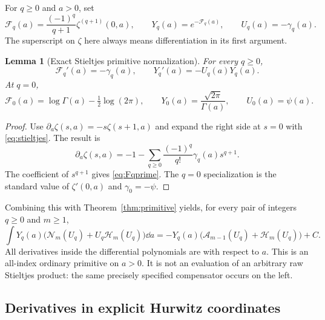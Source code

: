 \documentclass[11pt,letterpaper]{article}
\numberwithin{equation}{section}
\theoremstyle{plain}
\newtheorem{lemma}[theorem]{Lemma}
\theoremstyle{definition}
\theoremstyle{remark}
\newcommand{\Ac}{\mathcal A}\newcommand{\Nc}{\mathcal N}\newcommand{\Hc}{\mathcal H}
\begin{document}
For $q\ge0$ and $a>0$, set
\begin{equation}\label{eq:Fq}
 \mathcal F_q(a)=\frac{(-1)^q}{q+1}\zeta^{(q+1)}(0,a),
 \qquad Y_q(a)=e^{-\mathcal F_q(a)},
 \qquad U_q(a)=-\gamma_q(a).
\end{equation}
The superscript on $\zeta$ here always means differentiation in its first argument.

\begin{lemma}[Exact Stieltjes primitive normalization]\label{lem:Fq}
For every $q\ge0$,
\begin{equation}\label{eq:Fqprime}
 \mathcal F_q'(a)=-\gamma_q(a),\qquad
 Y_q'(a)=-U_q(a)Y_q(a).
\end{equation}
At $q=0$,
\[
 \mathcal F_0(a)=\log\Gamma(a)-\tfrac12\log(2\pi),
 \qquad Y_0(a)=\frac{\sqrt{2\pi}}{\Gamma(a)},\qquad U_0(a)=\psi(a).
\]
\end{lemma}
\begin{proof}
Use $\partial_a\zeta(s,a)=-s\zeta(s+1,a)$ and expand the right side at $s=0$ with \eqref{eq:stieltjes}. The result is
\[
 \partial_a\zeta(s,a)=-1-
       \sum_{q\ge0}\frac{(-1)^q}{q!}\gamma_q(a)s^{q+1}.
\]
The coefficient of $s^{q+1}$ gives \eqref{eq:Fqprime}. The $q=0$ specialization is the standard value of $\zeta'(0,a)$ and $\gamma_0=-\psi$.
\end{proof}

Combining this with Theorem~\ref{thm:primitive} yields, for every pair of integers $q\ge0$ and $m\ge1$,
\begin{equation}\label{eq:stieltjes-weighted}
 \boxed{\displaystyle
 \int Y_q(a)\bigl(\Nc_m(U_q)+U_q\Hc_m(U_q)\bigr)\dd a
 =-Y_q(a)\bigl(\Ac_{m-1}(U_q)+\Hc_m(U_q)\bigr)+C.}
\end{equation}
All derivatives inside the differential polynomials are with respect to $a$. This is an all-index ordinary primitive on $a>0$. It is not an evaluation of an arbitrary raw Stieltjes product: the same precisely specified compensator occurs on the left.

\subsection{Derivatives in explicit Hurwitz coordinates}
\end{document}

